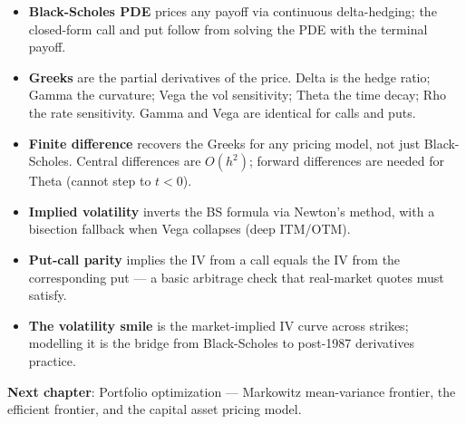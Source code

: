 \begin{itemize}
    \item \textbf{Black-Scholes PDE} prices any payoff via continuous
      delta-hedging; the closed-form call and put follow from solving
      the PDE with the terminal payoff.
    \item \textbf{Greeks} are the partial derivatives of the price.
      Delta is the hedge ratio; Gamma the curvature; Vega the vol
      sensitivity; Theta the time decay; Rho the rate sensitivity. Gamma
      and Vega are identical for calls and puts.
    \item \textbf{Finite difference} recovers the Greeks for any pricing
      model, not just Black-Scholes. Central differences are $O(h^2)$;
      forward differences are needed for Theta (cannot step to $t < 0$).
    \item \textbf{Implied volatility} inverts the BS formula via Newton's
      method, with a bisection fallback when Vega collapses (deep ITM/OTM).
    \item \textbf{Put-call parity} implies the IV from a call equals the
      IV from the corresponding put --- a basic arbitrage check that
      real-market quotes must satisfy.
    \item \textbf{The volatility smile} is the market-implied IV curve
      across strikes; modelling it is the bridge from Black-Scholes to
      post-1987 derivatives practice.
\end{itemize}

\vspace{1em}
\noindent\textbf{Next chapter}: Portfolio optimization --- Markowitz
mean-variance frontier, the efficient frontier, and the capital asset
pricing model.